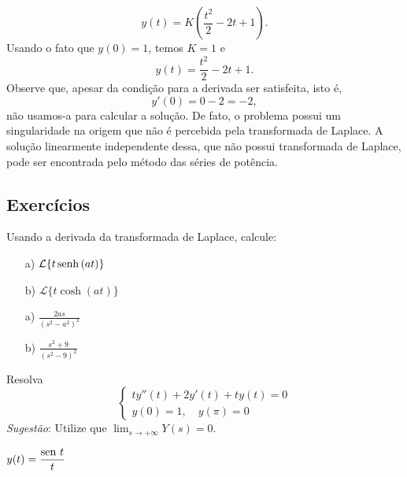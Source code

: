 \begin{ex}
\begin{equation}
y(t)=K\left(\frac{t^2}{2}-2t+1\right).
\end{equation}
Usando o fato que $y(0)=1$, temos $K=1$ e
\begin{equation}
y(t)=\frac{t^2}{2}-2t+1.
\end{equation}
Observe que, apesar da condição para a derivada ser satisfeita, isto é,
\begin{equation}
y'(0)=0-2=-2,
\end{equation}
não usamos-a para calcular a solução. De fato, o problema possui um singularidade na origem que não é percebida pela transformada de Laplace. A solução linearmente independente dessa, que não possui transformada de Laplace, pode ser encontrada pelo método das séries de potência.
\end{ex}

\subsection*{Exercícios}
\begin{exer}
Usando a derivada da transformada de Laplace, calcule:
\begin{itemize}
  \item[a)] $\displaystyle \mathcal{L} \{ t \operatorname{senh}\, (at) \}$
  \item[b)] $\displaystyle \mathcal{L} \{ t \cosh (at) \}$
\end{itemize}
\end{exer}
\begin{resp}
 \begin{itemize}
  \item[a)] $\displaystyle \frac{2as}{(s^2 - a^2)^2}$
  \item[b)] $\displaystyle \frac{s^2 + 9}{(s^2 - 9)^2}$
 \end{itemize}
\end{resp}
\begin{exer}
Resolva
\[
\left\{
  \begin{array}{ll}
    ty'' (t) + 2y'(t) +ty(t) = 0 \\
    y(0)=1, \quad y(\pi) = 0
  \end{array}
\right.
\] \emph{Sugestão}: Utilize que $\displaystyle \lim_{s\to + \infty} Y(s) = 0.$
\end{exer}
\begin{resp}
 $\displaystyle y(t) = \frac{\operatorname{sen}\, t}{t}$
\end{resp}


